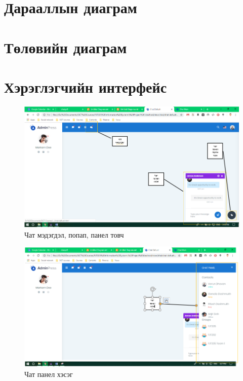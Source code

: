 \section{Дарааллын диаграм }

\section{Төлөвийн диаграм }

\section{Хэрэглэгчийн интерфейс }
\begin{figure}[htbp]
	\centering
	\includegraphics[scale=0.7]{Chart/Interface1}
	\caption[Хэрэглэгчийн интерфейс]{Чат мэдэгдэл, попап, панел товч}
	\label{fit:Interface}
\end{figure}
\begin{figure}[htbp]
	\centering
	\includegraphics[scale=0.7]{Chart/Interface2}
	\caption[Хэрэглэгчийн интерфейс]{Чат панел хэсэг}
	\label{fit:Interface}
\end{figure}
